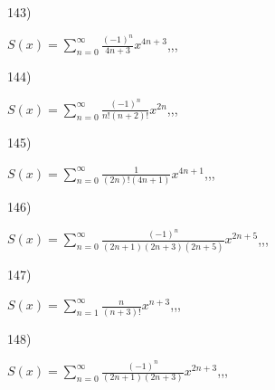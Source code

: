 \documentclass[11pt, ukrainian]{article}
\begin{document}
\par
\vspace{0.9cm}
143) \space 
{%
{$S(x)=\sum\limits_{n=0}^{\infty}{\frac{(-1)^n}{4n+3}}{x^{{4n+3}}}$},,, \par \smallskip  
}
\par
\vspace{0.9cm}
144) \space 
{%
{$S(x)=\sum\limits_{n=0}^{\infty}{\frac{(-1)^n}{n!(n+2)!}}{x^{{2n}}}$},,, \par \smallskip  
}
\par
\newpage
145) \space 
{%
{$S(x)=\sum\limits_{n=0}^{\infty}{\frac{1}{(2n)!(4n+1)}}{x^{{4n+1}}}$},,, \par \smallskip  
}
\par
\vspace{0.9cm}
146) \space 
{%
{$S(x)=\sum\limits_{n=0}^{\infty}{\frac{(-1)^n}{(2n+1)(2n+3)(2n+5)}}{x^{{2n+5}}}$},,, \par \smallskip  
}
\par
\vspace{0.9cm}
147) \space 
{%
{$S(x)=\sum\limits_{n=1}^{\infty}{\frac{n}{(n+3)!}}{x^{{n+3}}}$},,, \par \smallskip  
}
\par
\vspace{0.9cm}
148) \space 
{%
{$S(x)=\sum\limits_{n=0}^{\infty}{\frac{(-1)^n}{(2n+1)(2n+3)}}{x^{{2n+3}}}$},,, \par \smallskip  
}
\end{document}
